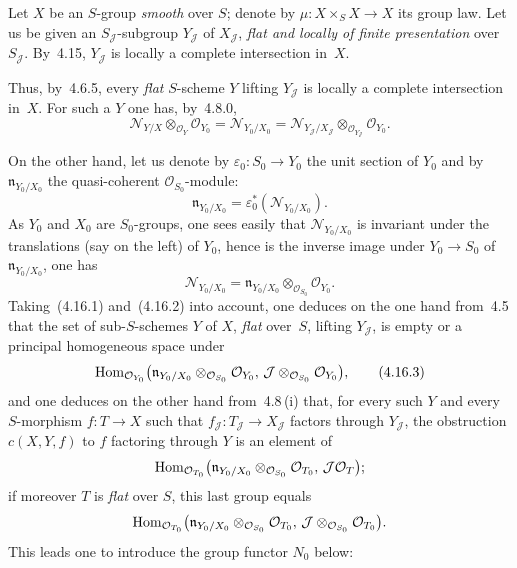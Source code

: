 \label{III.4.16}
{\renewcommand{\thefootnote}{(106)}}%
Let \(X\) be an \(S\)-group \emph{smooth} over \(S\); denote by
\(\mu\colon X\times_S X\to X\) its group law.
Let us be given an \(S_{\mathcal{J}}\)-subgroup \(Y_{\mathcal{J}}\) of
\(X_{\mathcal{J}}\), \emph{flat and locally of finite presentation}
over~\(S_{\mathcal{J}}\). By~4.15, \(Y_{\mathcal{J}}\) is locally a
complete intersection in~\(X\).

Thus, by~4.6.5, every \emph{flat}%
{\renewcommand{\thefootnote}{(107)}}
\(S\)-scheme \(Y\) lifting \(Y_{\mathcal{J}}\) is locally a complete
intersection in~\(X\). For such a \(Y\) one has, by~4.8.0,
\begin{equation}
\mathcal{N}_{Y/X}\otimes_{\mathcal{O}_Y}\mathcal{O}_{Y_0}
=\mathcal{N}_{Y_0/X_0}
=\mathcal{N}_{Y_{\mathcal{J}}/X_{\mathcal{J}}}
  \otimes_{\mathcal{O}_{Y_{\mathcal{J}}}}\mathcal{O}_{Y_0}.
\tag{4.16.1}
\end{equation}

On the other hand, let us denote by \(\varepsilon_0\colon S_0\to Y_0\) the
unit section of \(Y_0\) and by \(\mathfrak{n}_{Y_0/X_0}\) the
quasi-coherent \(\mathcal{O}_{S_0}\)-module:
\[
\mathfrak{n}_{Y_0/X_0}=\varepsilon_0^*(\mathcal{N}_{Y_0/X_0}).
\]
As \(Y_0\) and \(X_0\) are \(S_0\)-groups, one sees easily that
\(\mathcal{N}_{Y_0/X_0}\) is invariant under the translations (say on the
left) of \(Y_0\), hence%
{\renewcommand{\thefootnote}{(108)}}
is the inverse image under \(Y_0\to S_0\) of \(\mathfrak{n}_{Y_0/X_0}\),
\ie one has
\begin{equation}
\mathcal{N}_{Y_0/X_0}
=\mathfrak{n}_{Y_0/X_0}\otimes_{\mathcal{O}_{S_0}}\mathcal{O}_{Y_0}.
\tag{4.16.2}
\end{equation}
Taking~(4.16.1) and~(4.16.2) into account, one deduces on the one hand
from~4.5 that the set of sub-\(S\)-schemes \(Y\) of \(X\), \emph{flat}
over~\(S\), lifting \(Y_{\mathcal{J}}\), is empty or a principal
homogeneous space under
\begin{equation}
\operatorname{Hom}_{\mathcal{O}_{Y_0}}\bigl(
\mathfrak{n}_{Y_0/X_0}\otimes_{\mathcal{O}_{S_0}}\mathcal{O}_{Y_0},\,
\mathcal{J}\otimes_{\mathcal{O}_{S_0}}\mathcal{O}_{Y_0}\bigr),
\tag{4.16.3}
\end{equation}
and one deduces on the other hand from~4.8\,(i) that, for every such \(Y\)
and every \(S\)-morphism \(f\colon T\to X\) such that
\(f_{\mathcal{J}}\colon T_{\mathcal{J}}\to X_{\mathcal{J}}\) factors
through \(Y_{\mathcal{J}}\), the obstruction \(c(X,Y,f)\) to \(f\)
factoring through \(Y\) is an element of
\[
\operatorname{Hom}_{\mathcal{O}_{T_0}}\bigl(
\mathfrak{n}_{Y_0/X_0}\otimes_{\mathcal{O}_{S_0}}\mathcal{O}_{T_0},\,
\mathcal{J}\mathcal{O}_T\bigr);
\]
if moreover \(T\) is \emph{flat} over \(S\), this last group equals
\[
\operatorname{Hom}_{\mathcal{O}_{T_0}}\bigl(
\mathfrak{n}_{Y_0/X_0}\otimes_{\mathcal{O}_{S_0}}\mathcal{O}_{T_0},\,
\mathcal{J}\otimes_{\mathcal{O}_{S_0}}\mathcal{O}_{T_0}\bigr).
\]
This leads one to introduce the group functor \(N_0\) below:

